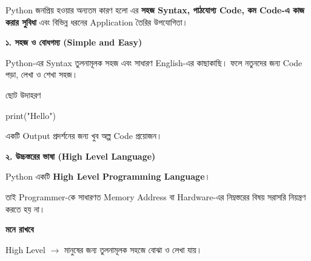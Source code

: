 
Python জনপ্রিয় হওয়ার অন্যতম কারণ হলো এর
\textbf{সহজ Syntax, পাঠযোগ্য Code, কম Code-এ কাজ করার সুবিধা}
এবং বিভিন্ন ধরনের Application তৈরির উপযোগিতা।




\textbf{\color{darkTeal}১. সহজ ও বোধগম্য (Simple and Easy)}

Python-এর Syntax তুলনামূলক সহজ এবং সাধারণ English-এর কাছাকাছি।
ফলে নতুনদের জন্য Code পড়া, লেখা ও শেখা সহজ।

\begin{examplebox}{ছোট উদাহরণ}

\begin{codebox}

\begin{english}
\ttfamily
print("Hello")
\end{english}

\end{codebox}

একটি Output প্রদর্শনের জন্য খুব অল্প Code প্রয়োজন।

\end{examplebox}


\textbf{\color{darkTeal}২. উচ্চস্তরের ভাষা (High Level Language)}

Python একটি \textbf{High Level Programming Language}।

তাই Programmer-কে সাধারণত Memory Address বা Hardware-এর
নিম্নস্তরের বিষয় সরাসরি নিয়ন্ত্রণ করতে হয় না।

\begin{rememberbox}

\textbf{\color{deepOrange}মনে রাখবে}

High Level
\(\longrightarrow\)
মানুষের জন্য তুলনামূলক সহজে বোঝা ও লেখা যায়।

\end{rememberbox}


